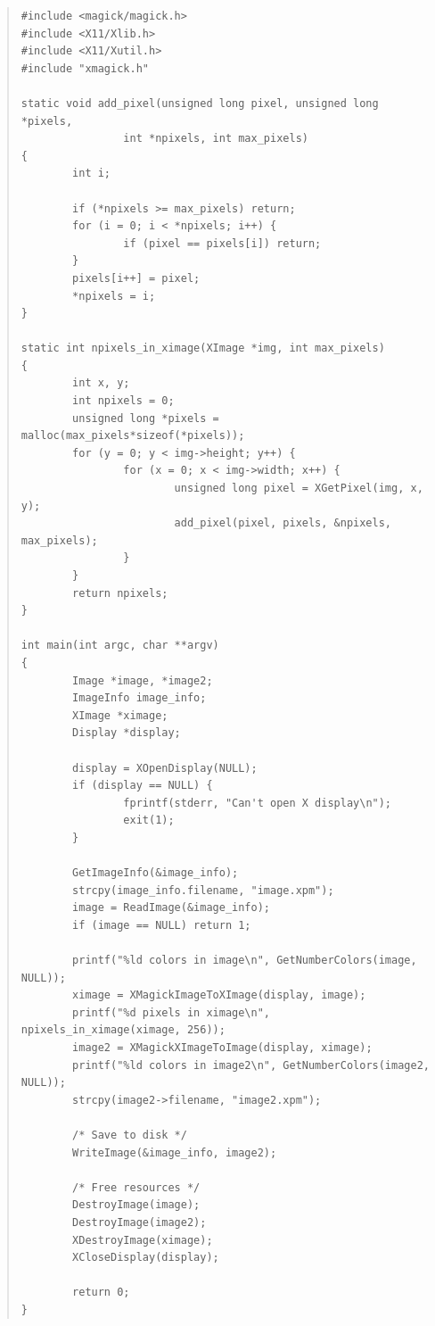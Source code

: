 \documentclass[twoside,11pt]{article}
\begin{document}
\small
\begin{quote}
\begin{verbatim}
#include <magick/magick.h>
#include <X11/Xlib.h>
#include <X11/Xutil.h>
#include "xmagick.h"

static void add_pixel(unsigned long pixel, unsigned long *pixels,
                int *npixels, int max_pixels)
{
        int i;

        if (*npixels >= max_pixels) return;
        for (i = 0; i < *npixels; i++) {
                if (pixel == pixels[i]) return;
        }
        pixels[i++] = pixel;
        *npixels = i;
}

static int npixels_in_ximage(XImage *img, int max_pixels)
{
        int x, y;
        int npixels = 0;
        unsigned long *pixels = malloc(max_pixels*sizeof(*pixels));
        for (y = 0; y < img->height; y++) {
                for (x = 0; x < img->width; x++) {
                        unsigned long pixel = XGetPixel(img, x, y);
                        add_pixel(pixel, pixels, &npixels, max_pixels);
                }
        }
        return npixels;
}

int main(int argc, char **argv)
{
        Image *image, *image2;
        ImageInfo image_info;
        XImage *ximage;
        Display *display;

        display = XOpenDisplay(NULL);
        if (display == NULL) {
                fprintf(stderr, "Can't open X display\n");
                exit(1);
        }

        GetImageInfo(&image_info);
        strcpy(image_info.filename, "image.xpm");
        image = ReadImage(&image_info);
        if (image == NULL) return 1;

        printf("%ld colors in image\n", GetNumberColors(image, NULL));
        ximage = XMagickImageToXImage(display, image);
        printf("%d pixels in ximage\n", npixels_in_ximage(ximage, 256));
        image2 = XMagickXImageToImage(display, ximage);
        printf("%ld colors in image2\n", GetNumberColors(image2, NULL));
        strcpy(image2->filename, "image2.xpm");

        /* Save to disk */
        WriteImage(&image_info, image2);

        /* Free resources */
        DestroyImage(image);
        DestroyImage(image2);
        XDestroyImage(ximage);
        XCloseDisplay(display);

        return 0;
}
\end{verbatim}
\end{quote}
\normalsize
\end{document}

